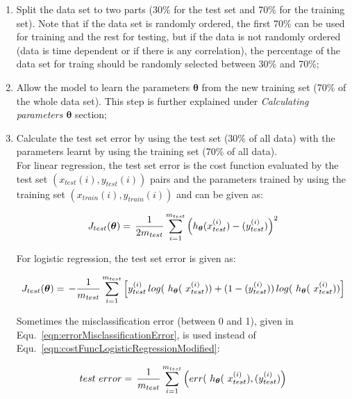  \begin{enumerate}
 
  \item Split the data set to two parts (30\% for the test set and 70\% for the training set). 
  Note that if the data set is randomly ordered, the first 70\% can be used for training and the rest for testing, but if the data is not randomly ordered (data is time dependent or if there is any correlation), the percentage of the data set for traing should be randomly selected between 30\% and 70\%; %
  
  \item Allow the model to learn the parameters $\bm{\theta}$ from the new training set (70\% of the whole data set). This step is further explained under \emph{Calculating parameters ${\bm{\theta}}$} section;

  \item Calculate the test set error by using the test set (30\% of all data) with the parameters learnt by using the training set (70\% of all data).\\
  For linear regression, the test set error is the cost function evaluated by the test set $(x_{test}(i), y_{test}(i))$ pairs and the parameters trained by using the training set $(x_{train}(i), y_{train}(i))$ and can be given as:
	
	\begin{equation}{\label{eqn:costFuncTest}}
	J_{test}({\bm{\theta}})
	=\,
	\frac{1}{2m_{test}} \sum\limits_{i=1}^{m_{test}} \Big(h_{\bm{\theta}}(x_{test}^{(i)}) - (y_{test}^{(i)})\Big)^2  
	\end{equation} 
	
	For logistic regression, the test set error is given as:
	
	\begin{equation}{\label{eqn:costFuncLogisticRegressionModified}}
	J_{test}({\bm{\theta}})
	=\,
	-\frac{1}{m_{test}} \sum\limits_{i=1}^{m_{test}} \Big[y_{test}^{(i)}\,log(\ h_{\bm{\theta}}(\ x_{test}^{(i)})) + (1-(y_{test}^{(i)}))\,log(\ h_{\bm{\theta}}(\ x_{test}^{(i)}))\Big]
	\end{equation} 
	
	Sometimes the misclassification error (between 0 and 1), given in Equ.~\ref{eqn:errorMisclassificationError}, is used instead of Equ.~\ref{eqn:costFuncLogisticRegressionModified}:

	\begin{equation}{\label{eqn:errorMisclassificationError}}
	 test\ error
	=\,
	\frac{1}{m_{test}} \sum\limits_{i=1}^{m_{test}} \Big(err(\ h_{\bm{\theta}}(\ x_{test}^{(i)}), (y_{test}^{(i)})\Big)  
	\end{equation}
	

\end{enumerate}
